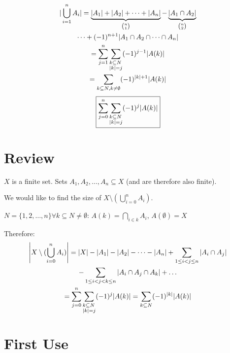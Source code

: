 \documentclass[00_complete]{subfiles}
\begin{document}
\begin{theorem}
    $$\begin{gathered}
        |\bigcup_{i=1}^nA_i| = \underbrace{|A_1|+|A_2|+\dots+|A_n|}_{\binom{n}{1}}
    - \underbrace{|A_1\cap A_2|}_{\binom{n}{2}} \\\dots +(-1)^{n+1}|A_1\cap A_2
    \cap \dots \cap A_n|\\
    =\sum_{j=1}^{n}\sum_{\begin{subarray}{l} k \subseteq N \\ |k| =
    j\end{subarray}} (-1)^{j-1}|A(k)| \\
    = \sum_{k \subseteq N, k \neq \emptyset} (-1)^{|k|+1}|A(k)|
    \end{gathered}
    $$
    $$\boxed{\sum_{j=0}^n\sum_{\begin{subarray}{l}k \subseteq N \\ |k|= j\end{subarray}}
    (-1)^j|A(k)|}$$
\end{theorem}

\section{Review}

$X$ is a finite set. Sets $A_1, A_2, \dots, A_n \subseteq X$ (and are therefore
also finite).

We would like to find the size of $X \setminus (\bigcup_{i=0}^nA_i)$.

$N=\{1,2,\dots, n\} \forall k \subseteq N \neq \emptyset$:
$A(k)=\bigcap_{i\in k} A_i$, $A(\emptyset)=X$

Therefore:
$$
\begin{gathered}
\left|X \setminus (\bigcup_{i=0}^nA_i)\right|=|X|
-|A_1|-|A_2|-\dots-|A_n|
+\sum_{1\leq i < j \leq n}|A_i\cap A_j|\\
-\sum_{1 \leq i<j<k \leq n}|A_i\cap A_j \cap A_k|+\dots\\
=\sum_{j=0}^n\sum_{\begin{subarray}{1}k\subseteq
N\\|k|=j\end{subarray}}(-1)^j|A(k)|=
\sum_{k \subseteq N} (-1)^{|k|}|A(k)|
\end{gathered}
$$

\section{First Use}
\end{document}
